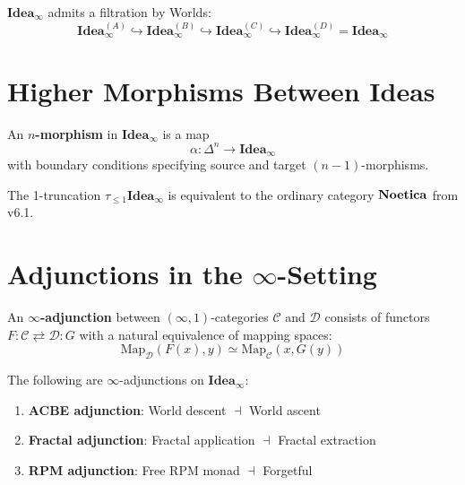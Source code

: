 \begin{proposition}
\label{prop:world-filtration}
$\mathbf{Idea}_\infty$ admits a filtration by Worlds:
\[
\mathbf{Idea}_\infty^{(A)} \hookrightarrow \mathbf{Idea}_\infty^{(B)} \hookrightarrow
\mathbf{Idea}_\infty^{(C)} \hookrightarrow \mathbf{Idea}_\infty^{(D)} = \mathbf{Idea}_\infty
\]
\end{proposition}

\section{Higher Morphisms Between Ideas}

\begin{definition}
\label{def:higher-morphism}
An \textbf{$n$-morphism} in $\mathbf{Idea}_\infty$ is a map
\[
\alpha : \Delta^n \to \mathbf{Idea}_\infty
\]
with boundary conditions specifying source and target $(n-1)$-morphisms.
\end{definition}

\begin{proposition}
\label{prop:truncation}
The 1-truncation $\tau_{\leq 1}\mathbf{Idea}_\infty$ is equivalent to the ordinary
category $\mathbf{Noetica}$ from v6.1.
\end{proposition}

\section{Adjunctions in the $\infty$-Setting}

\begin{definition}
\label{def:infty-adjunction}
An \textbf{$\infty$-adjunction} between $(\infty,1)$-categories $\mathcal{C}$ and $\mathcal{D}$
consists of functors $F : \mathcal{C} \rightleftarrows \mathcal{D} : G$ with a natural
equivalence of mapping spaces:
\[
\mathrm{Map}_\mathcal{D}(F(x), y) \simeq \mathrm{Map}_\mathcal{C}(x, G(y))
\]
\end{definition}

\begin{theorem}
\label{thm:noetic-adjunctions}
The following are $\infty$-adjunctions on $\mathbf{Idea}_\infty$:
\begin{enumerate}[label=(\roman*)]
  \item \textbf{ACBE adjunction}: World descent $\dashv$ World ascent
  \item \textbf{Fractal adjunction}: Fractal application $\dashv$ Fractal extraction
  \item \textbf{RPM adjunction}: Free RPM monad $\dashv$ Forgetful
\end{enumerate}
\end{theorem}

